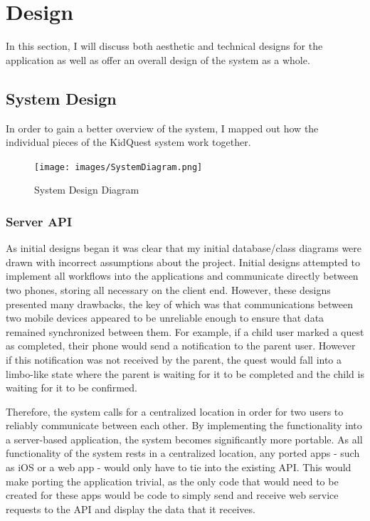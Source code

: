 \chapter{Design}
In this section, I will discuss both aesthetic and technical designs for the application as well as offer an overall design of the system as a whole.

\section{System Design}
In order to gain a better overview of the system, I mapped out how the individual pieces of the KidQuest system work together.

\begin{figure}[ht]
	\centering
	\texttt{[image: images/SystemDiagram.png]}
	\caption{System Design Diagram}
	\label{fig:systemdesign}
\end{figure} 

\subsection{Server API}
As initial designs began it was clear that my initial database/class diagrams were drawn with incorrect assumptions about the project. 
Initial designs attempted to implement all workflows into the applications and communicate directly between two phones, storing all necessary on the client end. 
However, these designs presented many drawbacks, the key of which was that communications between two mobile devices appeared to be unreliable enough to ensure that data remained synchronized between them.
For example, if a child user marked a quest as completed, their phone would send a notification to the parent user.
However if this notification was not received by the parent, the quest would fall into a limbo-like state where the parent is waiting for it to be completed and the child is waiting for it to be confirmed.

Therefore, the system calls for a centralized location in order for two users to reliably communicate between each other.
By implementing the functionality into a server-based application, the system becomes significantly more portable. 
As all functionality of the system rests in a centralized location, any ported apps - such as iOS or a web app - would only have to tie into the existing API.
This would make porting the application trivial, as the only code that would need to be created for these apps would be code to simply send and receive web service requests to the API and display the data that it receives.

